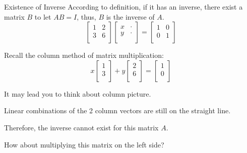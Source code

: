 \documentclass{beamer}
\begin{document}
\begin{frame}{Existence of Inverse}
According to definition, if it has an inverse, there exist a matrix $B$ to let $AB=I$, thus, $B$ is the inverse of $A$.
\begin{equation*}
    \left[ \begin{matrix}
        1&		2\\
        3&		6\\
    \end{matrix} \right] \left[ \begin{matrix}
        x&		\cdot\\
        y&		\cdot\\
    \end{matrix} \right] =\left[ \begin{matrix}
        1&		0\\
        0&		1\\
    \end{matrix} \right]
\end{equation*}

Recall the column method of matrix multiplication:
\begin{equation*}
    x\left[ \begin{array}{c}
        1\\
        3\\
    \end{array} \right] +y\left[ \begin{array}{c}
        2\\
        6\\
    \end{array} \right] =\left[ \begin{array}{c}
        1\\
        0\\
    \end{array} \right]
\end{equation*}

It may lead you to think about column picture.

\vspace{3pt}
Linear combinations of the 2 column vectors are still on the straight line.

\vspace{3pt}
Therefore, the inverse cannot exist for this matrix $A$.

\vspace{3pt}
How about multiplying this matrix on the left side?
\end{frame}
\end{document}
